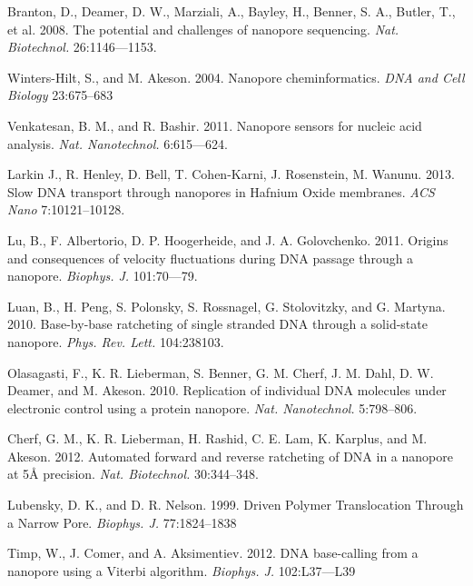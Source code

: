 \documentclass{biophys_letter}
\begin{document}
\begin{thebibliography}{99}

  Branton, D., Deamer, D. W., Marziali, A., Bayley, H., Benner, S. A., Butler, T., et al.
  2008.
  The potential and challenges of nanopore sequencing.
  {\it Nat. Biotechnol.}
  26:1146---1153.

  Winters-Hilt, S., and M. Akeson.
  2004.
  Nanopore cheminformatics.
  {\it DNA and Cell Biology}
  23:675--683

  Venkatesan, B. M., and R. Bashir.
  2011.
  Nanopore sensors for nucleic acid analysis.
  {\it Nat. Nanotechnol.}
  6:615---624.

  Larkin J., R. Henley, D. Bell, T. Cohen-Karni, J. Rosenstein, M. Wanunu.
  2013.
  Slow {DNA} transport through nanopores in {Hafnium} {Oxide} membranes.
  {\it ACS Nano}
  7:10121--10128.

  Lu, B., F. Albertorio, D. P. Hoogerheide, and J. A. Golovchenko.
  2011.
  Origins and consequences of velocity fluctuations during DNA passage through a nanopore.
  {\it Biophys. J.}
  101:70---79.

  Luan, B., H. Peng, S. Polonsky, S. Rossnagel, G. Stolovitzky, and G. Martyna.
  2010.
  Base-by-base ratcheting of single stranded DNA through a solid-state nanopore.
  {\it Phys. Rev. Lett.}
  104:238103.

  Olasagasti, F., K. R. Lieberman, S. Benner, G. M. Cherf, J. M. Dahl, D. W. Deamer, and M. Akeson.
  2010.
  Replication of individual DNA molecules under electronic control using a protein nanopore.
  {\it Nat. Nanotechnol.}
  5:798--806.

  Cherf, G. M., K. R. Lieberman, H. Rashid, C. E. Lam, K. Karplus, and M. Akeson.
  2012.
  Automated forward and reverse ratcheting of DNA in a nanopore at 5{\AA} precision.
  {\it Nat. Biotechnol.}
  30:344--348.

  Lubensky, D. K., and D. R. Nelson.
  1999.
  Driven Polymer Translocation Through a Narrow Pore.
  {\it Biophys. J.}
  77:1824--1838

  Timp, W., J. Comer, and A. Aksimentiev.
  2012.
  DNA base-calling from a nanopore using a Viterbi algorithm.
  {\it Biophys. J.}
  102:L37---L39



\end{thebibliography}
\end{document}
